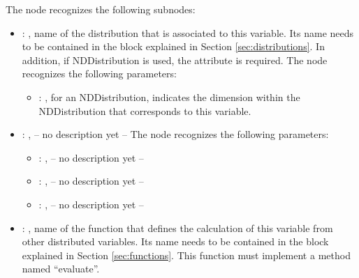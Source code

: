 \begin{itemize}
      The  node recognizes the following subnodes:
      \begin{itemize}
        \item {}: , 
          name of the distribution that is associated to this variable.               Its name needs
          to be contained in the  block explained               in Section
          \ref{sec:distributions}. In addition, if NDDistribution is used,               the
          attribute  is required. 
          The  node recognizes the following parameters:
            \begin{itemize}
              \item {}: , 
                for an NDDistribution, indicates the dimension within the NDDistribution that
                corresponds               to this variable.
          \end{itemize}

        \item {}: , 
          -- no description yet --
          The  node recognizes the following parameters:
            \begin{itemize}
              \item {}: , 
                -- no description yet --
              \item {}: , 
                -- no description yet --
              \item {}: , 
                -- no description yet --
          \end{itemize}

        \item {}: , 
          name of the function that               defines the calculation of this variable from
          other distributed variables.  Its name               needs to be contained in the
           block explained in Section               \ref{sec:functions}. This
          function must implement a method named ``evaluate''.               


\end{itemize}
\end{itemize}
